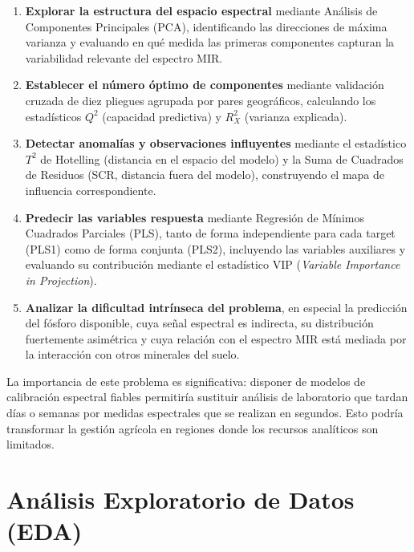 \documentclass[12pt, a4paper]{article}
\begin{document}
\begin{enumerate}
  \item \textbf{Explorar la estructura del espacio espectral} mediante Análisis de
        Componentes Principales (PCA), identificando las direcciones de máxima varianza y
        evaluando en qué medida las primeras componentes capturan la variabilidad
        relevante del espectro MIR.

  \item \textbf{Establecer el número óptimo de componentes} mediante validación cruzada
        de diez pliegues agrupada por pares geográficos, calculando los estadísticos
        $Q^2$ (capacidad predictiva) y $R^2_X$ (varianza explicada).

  \item \textbf{Detectar anomalías y observaciones influyentes} mediante el estadístico
        $T^2$ de Hotelling (distancia en el espacio del modelo) y la Suma de Cuadrados
        de Residuos (SCR, distancia fuera del modelo), construyendo el mapa de influencia
        correspondiente.

  \item \textbf{Predecir las variables respuesta} mediante Regresión de Mínimos
        Cuadrados Parciales (PLS), tanto de forma independiente para cada target
        (PLS1) como de forma conjunta (PLS2), incluyendo las variables auxiliares
        y evaluando su contribución mediante el estadístico VIP
        (\textit{Variable Importance in Projection}).

  \item \textbf{Analizar la dificultad intrínseca del problema}, en especial la
        predicción del fósforo disponible, cuya señal espectral es indirecta, su
        distribución fuertemente asimétrica y cuya relación con el espectro MIR
        está mediada por la interacción con otros minerales del suelo.
\end{enumerate}

La importancia de este problema es significativa: disponer de modelos de calibración
espectral fiables permitiría sustituir análisis de laboratorio que tardan días o semanas
por medidas espectrales que se realizan en segundos. Esto podría transformar la gestión
agrícola en regiones donde los recursos analíticos son limitados.

\section{Análisis Exploratorio de Datos (EDA)}
\end{document}
